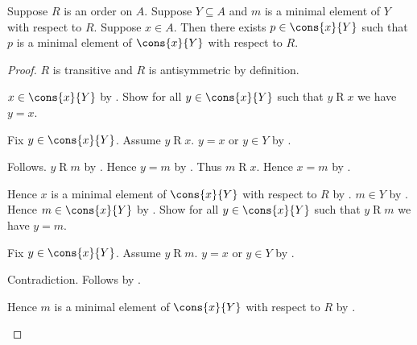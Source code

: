 \begin{proposition}\label{minimal_element_cons}
    Suppose $R$ is an order on $A$.
    Suppose $Y\subseteq A$ and
        $m$ is a minimal element of $Y$ with respect to $R$.
    Suppose $x\in A$.
    Then there exists $p\in\cons{x}{Y}$ such that
        $p$ is a minimal element of $\cons{x}{Y}$ with respect to $R$.
\end{proposition}
\begin{proof}
    $R$ is transitive and $R$ is antisymmetric by definition.
    \begin{byCase}
        $x\in\cons{x}{Y}$ by .
        Show for all $y\in\cons{x}{Y}$ such that $y\mathrel{R}x$
            we have $y=x$.
        \begin{subproof}
            Fix $y\in\cons{x}{Y}$.
            Assume $y\mathrel{R}x$.
            $y=x$ or $y\in Y$ by .
            \begin{byCase}
                Follows.
                $y\mathrel{R}m$ by .
                Hence $y=m$ by .
                Thus $m\mathrel{R}x$.
                Hence $x=m$ by .
            \end{byCase}
        \end{subproof}
        Hence $x$ is a minimal element of $\cons{x}{Y}$
            with respect to $R$ by .
        $m\in Y$ by .
        Hence $m\in\cons{x}{Y}$ by .
        Show for all $y\in\cons{x}{Y}$ such that $y\mathrel{R}m$
            we have $y=m$.
        \begin{subproof}
            Fix $y\in\cons{x}{Y}$.
            Assume $y\mathrel{R}m$.
            $y=x$ or $y\in Y$ by .
            \begin{byCase}
                Contradiction.
                Follows by .
            \end{byCase}
        \end{subproof}
        Hence $m$ is a minimal element of $\cons{x}{Y}$
            with respect to $R$ by .
    \end{byCase}
\end{proof}

